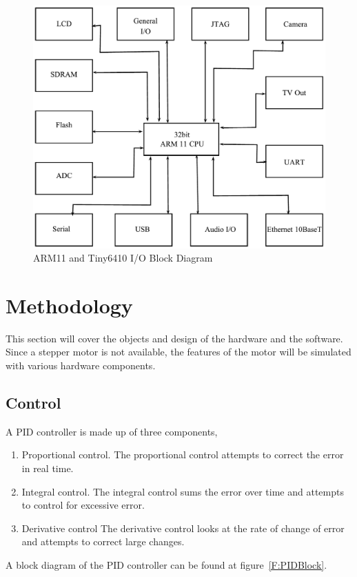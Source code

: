 \documentclass[10pt,conference]{IEEEtran}
\begin{document}
\begin{figure}[ht!]
	\includegraphics[scale=.30]{ARM11BlockDiagram}
	\caption{ARM11 and Tiny6410 I/O Block Diagram}\label{ARM11BlockDiagram}
\end{figure}


%
%
\section{Methodology}
This section will cover the objects and design of the hardware and the software. Since a stepper motor is not available, the features of the motor will be simulated with various hardware components.

\subsection{Control}
A PID controller is made up of three components,
\begin{enumerate}
	\item Proportional control. The proportional control attempts to correct the error in real time.
	\item Integral control. The integral control sums the error over time and attempts to control for excessive error.
	\item Derivative control The derivative control looks at the rate of change of error and attempts to correct large changes.
\end{enumerate}

A block diagram of the PID controller can be found at figure~\ref{F:PIDBlock}.
\end{document}
